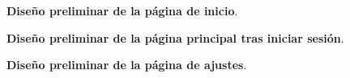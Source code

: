 \begin{figure}[H]
    \centering
    \caption{\textbf{Diseño preliminar de la página de inicio}.}
    \label{fig:pagina-inicio}
\end{figure}

\begin{figure}[H]
    \centering
    \caption{\textbf{Diseño preliminar de la página principal tras iniciar sesión}.}
    \label{fig:pagina-principal}
\end{figure}

\begin{figure}[H]
    \centering
    \caption{\textbf{Diseño preliminar de la página de ajustes}.}
    \label{fig:pagina-ajustes}
\end{figure}

